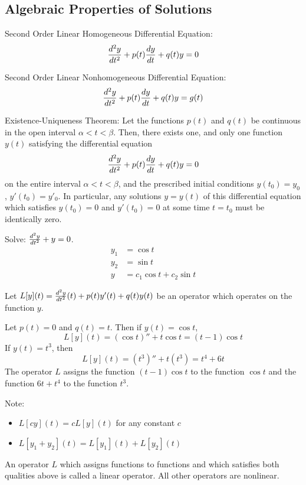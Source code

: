 \documentclass[12pt]{article}
\begin{document}
\subsection{Algebraic Properties of Solutions} 
\begin{definition} Second Order Linear Homogeneous Differential Equation: $$\frac{d^2y}{dt^2} + p(t)\frac{dy}{dt} + q(t)y = 0 $$ \end{definition} 
\begin{definition} Second Order Linear Nonhomogeneous Differential Equation: $$\frac{d^2y}{dt^2} + p(t)\frac{dy}{dt} + q(t)y = g(t) $$ \end{definition} 
\begin{theorem} Existence-Uniqueness Theorem: Let the functions $p(t)$ and $q(t)$ be continuous in the open interval $\alpha < t < \beta$. Then, there exists one, and only one function $y(t)$ satisfying the differential equation $$ \frac{d^2y}{dt^2} + p(t)\frac{dy}{dt} + q(t)y = 0 $$ on the entire interval $\alpha < t < \beta$, and the prescribed initial conditions $y(t_0) = y_0$, $y'(t_0) = y'_0$. In particular, any solutions $y = y(t)$ of this differential equation which satisfies $y(t_0) = 0$ and $y'(t_0) = 0$ at some time $t = t_0$ must be identically zero. \end{theorem} 
\begin{example} Solve: $\frac{d^2y}{dt^2} + y = 0$. $$\begin{aligned} y_1 &= \cos t \\ y_2 &= \sin t \\ y &= c_1\cos t + c_2\sin t  \end{aligned} $$ \end{example} 
Let $L[y](t) = \frac{d^2y}{dt^2}(t) + p(t)y'(t) + q(t)y(t)$ be an operator which operates on the function $y$. 
\begin{example} Let $p(t) = 0$ and $q(t) = t$. Then if $y(t) = \cos t$, $$L[y](t) = (\cos t)'' + t\cos t = (t - 1)\cos t $$ If $y(t) = t^3$, then $$L[y](t) = (t^3)'' + t(t^3) = t^4 + 6t $$ The operator $L$ assigns the function $(t - 1)\cos t$ to the function $\cos t$ and the function $6t + t^4$ to the function $t^3$. \end{example} 
Note: \begin{itemize} 
\item $L[cy](t) = cL[y](t)$ for any constant $c$ 
\item $L[y_1 + y_2](t) = L[y_1](t) + L[y_2](t)$ \end{itemize} 
\begin{definition} An operator $L$ which assigns functions to functions and which satisfies both qualities above is called a linear operator. All other operators are nonlinear. \end{definition} 
\end{document}
